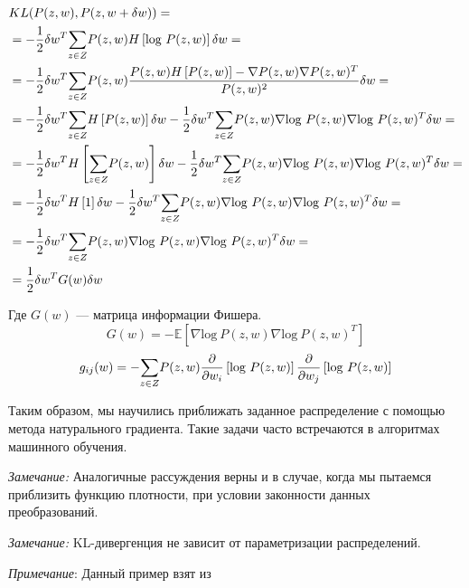 \documentclass[a4paper,12pt]{article}
\begin{document}
$$
\begin{aligned}
    & KL(P(z, w), P(z, w + \delta w)) = \\
    & = -\frac{1}{2} \delta w^T\overset{}{\underset{z \in Z}{\sum}}{P}(z, w) H\left[\mbox{log} ~ P(z, w)\right] \delta w = \\
    & = -\frac{1}{2} \delta w^T\overset{}{\underset{z \in Z}{\sum}}{P}(z, w) \frac{P(z, w) H\left[P(z, w)\right] - \nabla P(z, w)\nabla P(z, w)^T}{P(z, w)^2} \delta w = \\
    & = -\frac{1}{2} \delta w^T\overset{}{\underset{z \in Z}{\sum}}{H}\left[P(z, w)\right] \delta w - \frac{1}{2} \delta w^T\overset{}{\underset{z \in Z}{\sum}}{P}(z, w) \nabla \mbox{log} ~ P(z, w)\nabla \mbox{log} ~ P(z, w)^T \delta w = \\
    & = -\frac{1}{2} \delta w^TH\left[\overset{}{\underset{z \in Z}{\sum}}{P}(z, w)\right] \delta w - \frac{1}{2} \delta w^T\overset{}{\underset{z \in Z}{\sum}}{P}(z, w) \nabla \mbox{log} ~ P(z, w)\nabla \mbox{log} ~ P(z, w)^T \delta w = \\
    & = -\frac{1}{2} \delta w^TH\left[1\right] \delta w - \frac{1}{2} \delta w^T\overset{}{\underset{z \in Z}{\sum}}{P}(z, w) \nabla \mbox{log} ~ P(z, w)\nabla \mbox{log} ~ P(z, w)^T \delta w = \\
    & = -\frac{1}{2} \delta w^T\overset{}{\underset{z \in Z}{\sum}}{P}(z, w) \nabla \mbox{log} ~ P(z, w)\nabla \mbox{log} ~ P(z, w)^T \delta w = \\
    & = \frac{1}{2} \delta w^T G(w) \delta w \\
\end{aligned}
$$

Где $G(w)$ --- матрица информации Фишера. \label{FisherMatrix}
$$G(w) = \mathbb{-E} \left[ \nabla \mbox{log} ~ P(z, w) \nabla \mbox{log} ~ P(z, w)^T \right] $$
$$g_{ij}(w) = -\overset{}{\underset{z \in Z}{\sum}}{P(z, w)\frac{\partial}{\partial w_i}\left[ \mbox{log} ~ P(z, w)\right] \frac{\partial}{\partial w_j}\left[ \mbox{log} ~ P(z, w)\right]}$$

Таким образом, мы научились приближать заданное распределение с помощью метода натурального градиента. Такие задачи часто встречаются в алгоритмах машинного обучения.

\emph{Замечание:}
Аналогичные рассуждения верны и в случае, когда мы пытаемся приблизить функцию плотности, при условии законности данных преобразований.

\emph{Замечание:}
KL-дивергенция не зависит от параметризации распределений.

\emph{Примечание}:
Данный пример взят из \cite{AmariWorks}

\newpage
\end{document}
